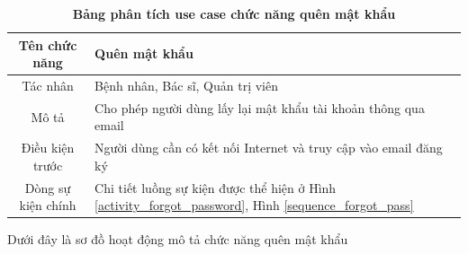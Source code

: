   \begin{table}[H]
    \caption{\bfseries \fontsize{12pt}{0pt}\selectfont Bảng phân tích use case chức năng quên mật khẩu}
    \centering
    \begin{tabularx}{0.9\textwidth}{|c|X|}
      \hline
      \textbf{Tên chức năng} & \textbf{Quên mật khẩu} \\
      \hline
      Tác nhân & Bệnh nhân, Bác sĩ, Quản trị viên \\
      \hline
      Mô tả & Cho phép người dùng lấy lại mật khẩu tài khoản thông qua email
       \\
      \hline
      Điều kiện trước & Người dùng cần có kết nối Internet và truy cập vào email đăng ký \\
      \hline
      Dòng sự kiện chính & 
        Chi tiết luồng sự kiện được thể hiện ở Hình \ref{activity_forgot_password}, Hình \ref{sequence_forgot_pass} 
        \\
      \hline
    \end{tabularx}
  \end{table}
  Dưới đây là sơ đồ hoạt động mô tả chức năng quên mật khẩu
